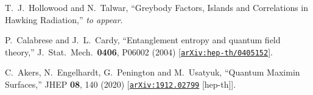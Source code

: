 \documentclass[12pt]{article}
\newcommand \arXiv [1]{\href{http://arxiv.org/abs/#1}{\tt arXiv:#1}}
\begin{document}
\begin{thebibliography}{99}
{%
T.~J.~Hollowood and N.~Talwar, ``Greybody Factors, Islands and Correlations in Hawking  Radiation,''
{\sl to appear\/}.
  
  
  P.~Calabrese and J.~L.~Cardy,
  ``Entanglement entropy and quantum field theory,''
  J.\ Stat.\ Mech.\  {\bf 0406}, P06002 (2004)
  [\arXiv{hep-th/0405152}].

C.~Akers, N.~Engelhardt, G.~Penington and M.~Usatyuk,
``Quantum Maximin Surfaces,''
JHEP \textbf{08}, 140 (2020)
[\arXiv{1912.02799} [hep-th]].

}
\end{thebibliography}
  
\end{document}
